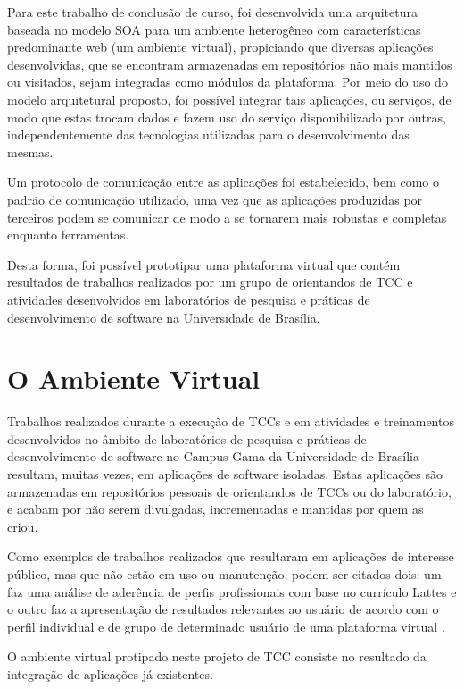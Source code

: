 Para este trabalho de conclusão de curso, foi desenvolvida uma arquitetura baseada no modelo SOA para um ambiente heterogêneo com características predominante web (um ambiente virtual), propiciando que diversas aplicações desenvolvidas, que se encontram armazenadas em repositórios não mais mantidos ou visitados, sejam integradas como módulos da plataforma. Por meio do uso do modelo arquitetural proposto, foi possível integrar tais aplicações, ou serviços, de modo que estas trocam dados e fazem uso do serviço disponibilizado por outras, independentemente das tecnologias utilizadas para o desenvolvimento das mesmas.

Um protocolo de comunicação entre as aplicações foi estabelecido, bem como o padrão de comunicação utilizado, uma vez que as aplicações produzidas por terceiros podem se comunicar de modo a se tornarem mais robustas e completas enquanto ferramentas.

Desta forma, foi possível prototipar uma plataforma virtual que contém resultados de trabalhos realizados por um grupo de orientandos de TCC e atividades desenvolvidos em laboratórios de pesquisa e práticas de desenvolvimento de software na Universidade de Brasília.

\section{O Ambiente Virtual}

Trabalhos realizados durante a execução de TCCs e em atividades e treinamentos desenvolvidos no âmbito de laboratórios de pesquisa e práticas de desenvolvimento de software no Campus Gama da Universidade de Brasília resultam, muitas vezes, em aplicações de software isoladas. Estas aplicações são armazenadas em repositórios pessoais de orientandos de TCCs ou do laboratório, e acabam por não serem divulgadas, incrementadas e mantidas por quem as criou.

Como exemplos de trabalhos realizados que resultaram em aplicações de interesse público, mas que não estão em uso ou manutenção, podem ser citados dois: um faz uma análise de aderência de perfis profissionais com base no currículo Lattes \cite{jesus_algoritmo_2014} e o outro faz a apresentação de resultados relevantes ao usuário de acordo com o perfil individual e de grupo de determinado usuário de uma plataforma virtual \cite{carvalho_sistema_2014}.

O ambiente virtual protipado neste projeto de TCC consiste no resultado da integração de aplicações já existentes.

